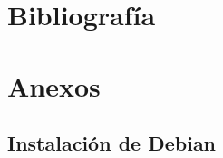 \documentclass[12pt,a4paper]{article}
\begin{document}
\newpage
\section{Bibliografía}                                                   %
\printbibliography                                                       %





\newpage

\section{Anexos}                                                         %





\subsection{Instalación de Debian}                                       %



        
\end{document}
